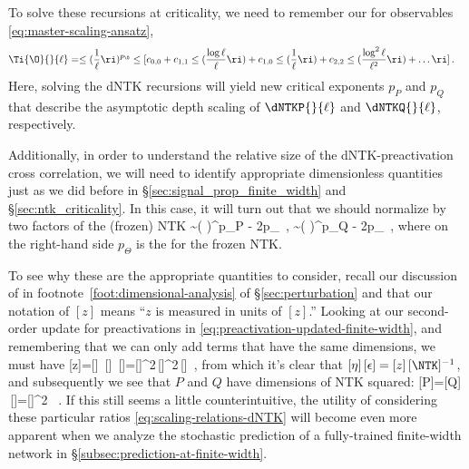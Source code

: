To solve these recursions at criticality, we need to remember our  for observables \eqref{eq:master-scaling-ansatz},
\begin{align}\label{eq:master-scaling-ansatz-reprint-the-second}
\Ti{\O}{}{\ell} &= \le( \frac{1}{\ell} \ri)^{p_\O} \le[c_{0,0}+  c_{1,1} \le( \frac{\log \ell}{\ell} \ri) + c_{1,0}\le( \frac{ 1}{\ell}\ri) +  c_{2,2} \le(  \frac{\log^2 \ell}{\ell^2} \ri)+  \dots \ri]\, .%
\end{align}
Here, solving the dNTK recursions will yield new critical exponents $p_P$ and $p_Q$ that describe the asymptotic depth scaling of $\dNTKP{}{\ell}$ and $\dNTKQ{}{\ell}$, respectively.


Additionally,  in order to understand the relative size of the dNTK-preactivation cross correlation, we will need to identify appropriate dimensionless quantities just as we did before in \S\ref{sec:signal_prop_finite_width} and \S\ref{sec:ntk_criticality}. 
In this case, it will turn out that we should normalize by 
two factors of the (frozen) NTK 
\be\label{eq:scaling-relations-dNTK}
 \sim {}\le(  \ri)^{p_P - 2p_\Theta} \,, \qquad {} \sim {}\le(  \ri)^{p_Q - 2p_\Theta}\, ,
\ee
where on the right-hand side $p_\Theta$ is the  for the frozen NTK. 

To see why these are the appropriate quantities to consider, 
recall our discussion of  in footnote~\ref{foot:dimensional-analysis} of \S\ref{sec:perturbation} and that our notation of $[z]$ means ``$z$ is measured in units of $[z]$.'' Looking at our second-order update for preactivations in \eqref{eq:preactivation-updated-finite-width}, and remembering that we can only add terms that have the same dimensions, we must have
\be\label{eq:dNTK-dimensional-analysis}
[z]=[\eta]\, [\epsilon] \,[\NTK]=[\eta]^2\,[\epsilon]^2\,[\dNTK] \,,
\ee 
from which it's clear that $[\eta]\,[\epsilon]=[z]\,[\NTK]^{-1}$, and subsequently we see that $P$ and $Q$ have dimensions of  NTK squared:
\be\label{eq:dimensions-of-P-Q}
[P]=[Q] \equiv [z]\,[\dNTK]=[\NTK]^{2} \, . 
\ee
If this still seems a little counterintuitive, the utility of considering these particular ratios \eqref{eq:scaling-relations-dNTK} will become even more apparent when we analyze the stochastic prediction of a fully-trained finite-width network in \S\ref{subsec:prediction-at-finite-width}.





